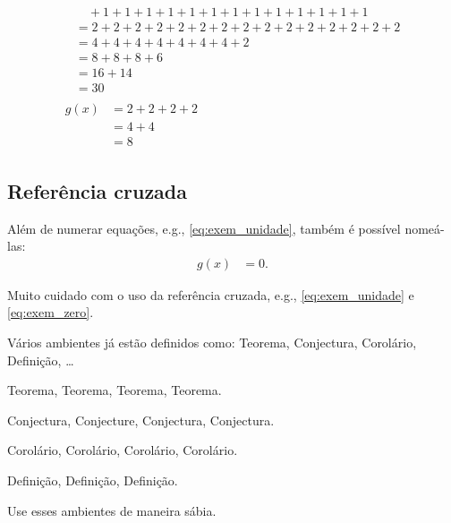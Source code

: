 \begin{description}
\begin{align}
\begin{split}
        &\quad {}+ 1 + 1 + 1 + 1 + 1 + 1 + 1 + 1 + 1 + 1 + 1 + 1 + 1 \\
        &= 2 + 2 + 2 + 2 + 2 + 2 + 2 + 2 + 2 + 2 + 2 + 2 + 2 + 2 + 2 \\
        &= 4 + 4 + 4 + 4 + 4 + 4 + 4 + 2 \\
        &= 8 + 8 + 8 + 6 \\
        &= 16 + 14 \\
        &= 30
      \end{split} \\
      \begin{split}
        g(x) &= 2 + 2 + 2 + 2 \\
        &= 4 + 4 \\
        &= 8
      \end{split}
    \end{align}
\end{description}

\subsection{Refer\^{e}ncia cruzada}
Al\'{e}m de numerar equa\c{c}\~{o}es, e.g., \eqref{eq:exem_unidade}, tamb\'{e}m \'{e}
poss\'ivel nome\'a-las:
\begin{align}
    g(x) &= 0.
    \tag{EIN}
    \label{eq:exem_zero}
\end{align}

Muito cuidado com o uso da refer\^{e}ncia cruzada, e.g.,
\eqref{eq:exem_unidade} e \eqref{eq:exem_zero}.

V\'arios ambientes j\'a est\~{a}o definidos como: Teorema, Conjectura, Corol\'ario,
Defini\c{c}\~{a}o, \ldots

\begin{thm}
Teorema, Teorema, Teorema, Teorema.
\end{thm}

\begin{con}
Conjectura, Conjecture, Conjectura, Conjectura.
\end{con}

\begin{cor}
Corol\'ario, Corol\'ario, Corol\'ario, Corol\'ario.
\end{cor}

\begin{dfn}
Defini\c{c}\~{a}o, Defini\c{c}\~{a}o, Defini\c{c}\~{a}o.
\end{dfn}

Use esses ambientes de maneira s\'abia.
